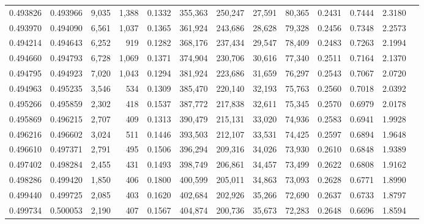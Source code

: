 \begin{tabular}{rrrrrrrrrrrrr}
0.493826 & 0.493966 &  9,035 & 1,388 &                                     0.1332 & 355,363 & 250,247 &  27,591 &  80,365 & 0.2431 & 0.7444 & 2.3180 \\
0.493970 & 0.494090 &  6,561 & 1,037 &                                     0.1365 & 361,924 & 243,686 &  28,628 &  79,328 & 0.2456 & 0.7348 & 2.2573 \\
0.494214 & 0.494643 &  6,252 &   919 &                                     0.1282 & 368,176 & 237,434 &  29,547 &  78,409 & 0.2483 & 0.7263 & 2.1994 \\
0.494660 & 0.494793 &  6,728 & 1,069 &                                     0.1371 & 374,904 & 230,706 &  30,616 &  77,340 & 0.2511 & 0.7164 & 2.1370 \\
0.494795 & 0.494923 &  7,020 & 1,043 &                                     0.1294 & 381,924 & 223,686 &  31,659 &  76,297 & 0.2543 & 0.7067 & 2.0720 \\
0.494963 & 0.495235 &  3,546 &   534 &                                     0.1309 & 385,470 & 220,140 &  32,193 &  75,763 & 0.2560 & 0.7018 & 2.0392 \\
0.495266 & 0.495859 &  2,302 &   418 &                                     0.1537 & 387,772 & 217,838 &  32,611 &  75,345 & 0.2570 & 0.6979 & 2.0178 \\
0.495869 & 0.496215 &  2,707 &   409 &                                     0.1313 & 390,479 & 215,131 &  33,020 &  74,936 & 0.2583 & 0.6941 & 1.9928 \\
0.496216 & 0.496602 &  3,024 &   511 &                                     0.1446 & 393,503 & 212,107 &  33,531 &  74,425 & 0.2597 & 0.6894 & 1.9648 \\
0.496610 & 0.497371 &  2,791 &   495 &                                     0.1506 & 396,294 & 209,316 &  34,026 &  73,930 & 0.2610 & 0.6848 & 1.9389 \\
0.497402 & 0.498284 &  2,455 &   431 &                                     0.1493 & 398,749 & 206,861 &  34,457 &  73,499 & 0.2622 & 0.6808 & 1.9162 \\
0.498286 & 0.499420 &  1,850 &   406 &                                     0.1800 & 400,599 & 205,011 &  34,863 &  73,093 & 0.2628 & 0.6771 & 1.8990 \\
0.499440 & 0.499725 &  2,085 &   403 &                                     0.1620 & 402,684 & 202,926 &  35,266 &  72,690 & 0.2637 & 0.6733 & 1.8797 \\
0.499734 & 0.500053 &  2,190 &   407 &                                     0.1567 & 404,874 & 200,736 &  35,673 &  72,283 & 0.2648 & 0.6696 & 1.8594 \\

\end{tabular}
